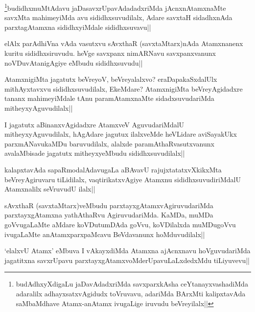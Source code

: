 
\begin{artha}
\footnote{budAdhxyXdigaLu jaDavAdadxriMda savxparxkAsha ceYtanayxvashadiMda adaralilx adhayxsatxvAgidudx toVruvavu, adariMda BArxMti kalipxtavAda saMbaMdhave Atamx-anAtamx ivugaLige iruvudu beVreyilalx||}budidhxmuMtAdavu jaDasavxrUpavAdadadxriMda jAcnxnAtamxnaMte savxMta mahimeyiMda avu sididhxsuvudilalx, Adare savxtaH sidadhxnAda parxtagAtamxna sididhxyiMdale sididhxsuvavu||
\end{artha}


\begin{artha}
elAlx parAdhiVna vAda vasutxvu sAvxthaR (savxtaMtarx)nAda Atamxnanenx kuritu sididhxsiruvudu. heVge savxpanx nimARNavu savxpanxvanunx noVDuvAtanigAgiye eMbudu sididhxsuvudu||
\end{artha}



\begin{artha}
AtamxnigiMta jagatutx beVreyoV, beVreyalalxvo? eraDapakaSxdalUlx mithAyxtavxvu sididhxsuvudilalx, EkeMdare? AtamxnigiMta beVreyAgidadxre tananx mahimeyiMdale tAnu paramAtamxnaMte sidadxsuvudariMda mitheyxyAguvudilalx||
\end{artha}


\begin{artha}
I jagatutx aBinanxvAgidadxre AtamxveV AguvudariMdalU mitheyxyAguvudilalx, hAgAdare jagutux ilalxveMde heVLidare aviSayakUkx parxmANavukaMDu baruvudilalx, alalxde paramAthaRvasutxvanunx avalaMbisade jagatutx mitheyxyeMbudu sididhxsuvudilalx||
\end{artha}


\begin{artha}
kalapxtavAda sapaRmodalAdavugaLa aBAvavU rajujxtatatxvXkikxMta beVreyAgiruvaru tiLidilalx, vaqtirikatxvAgiye Atamxnu sididhxsuvudiriMdalU Atamxnalilx seVruvudU ilalx||
\end{artha}


\begin{artha}
sAvxthaR (savxtaMtarx)veMbudu parxtayxgAtamxvAgiruvudariMda parxtayxgAtamxna yathAthaRvu AgiruvudariMda. KaMDa, muMDa goVvugaLaMte aMdare koVDutumDAda goVvu, koVDilalxda muMDugoVvu ivugaLaMte anAtamxparxpaMcavu BeVdavanunx hoMduvudilalx||
\end{artha}

\begin{artha}
`elalxvU Atamx' eMbuva I vAkayxdiMda Atamxna ajAcnxnavu hoVguvudariMda jagatitxna savxrUpavu parxtayxgAtamxvoMderUpavuLaLxdedxMdu tiLiyuvevu||
\end{artha}
